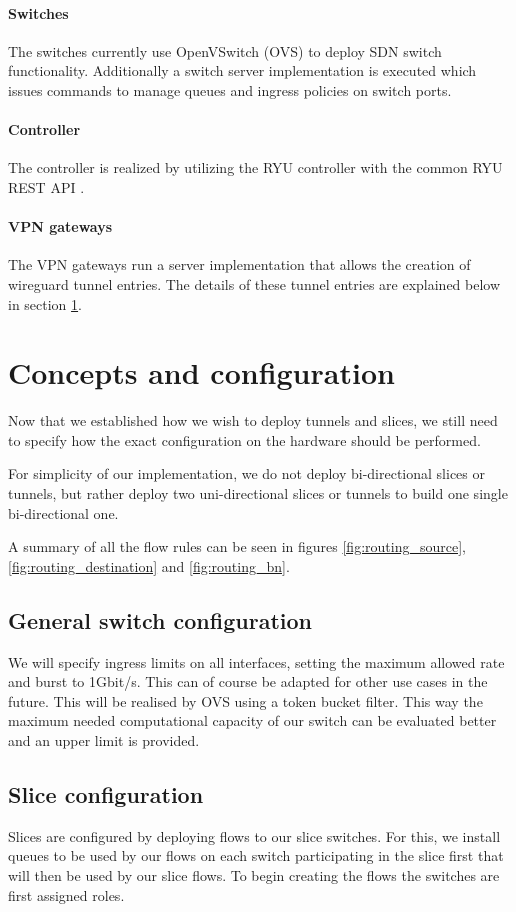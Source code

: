 \paragraph{Switches} The switches currently use OpenVSwitch (OVS) \cite{openvswitch} to deploy SDN switch functionality. Additionally a switch server implementation is executed which issues commands to manage queues and ingress policies on switch ports.
\paragraph{Controller} The controller is realized by utilizing the RYU controller \cite{ryu} with the common RYU REST API \cite{ryu-rest}.
\paragraph{VPN gateways} The VPN gateways run a server implementation that allows the creation of wireguard \cite{wireguard} tunnel entries. The details of these tunnel entries are explained below in section \ref{impl_concepts}.

\section{Concepts and configuration}
\label{impl_concepts}
Now that we established how we wish to deploy tunnels and slices, we still need to specify how the exact configuration on the hardware should be performed.

For simplicity of our implementation, we do not deploy bi-directional slices or tunnels, but rather deploy two uni-directional slices or tunnels to build one single bi-directional one.

A summary of all the flow rules can be seen in figures \ref{fig:routing_source}, \ref{fig:routing_destination} and \ref{fig:routing_bn}.

\subsection{General switch configuration}
We will specify ingress limits on all interfaces, setting the maximum allowed rate and burst to 1Gbit/s. This can of course be adapted for other use cases in the future. This will be realised by OVS using a token bucket filter. This way the maximum needed computational capacity of our switch can be evaluated better and an upper limit is provided.

\subsection{Slice configuration}
Slices are configured by deploying flows to our slice switches. For this, we install queues to be used by our flows on each switch participating in the slice first that will then be used by our slice flows. To begin creating the flows the switches are first assigned roles.

